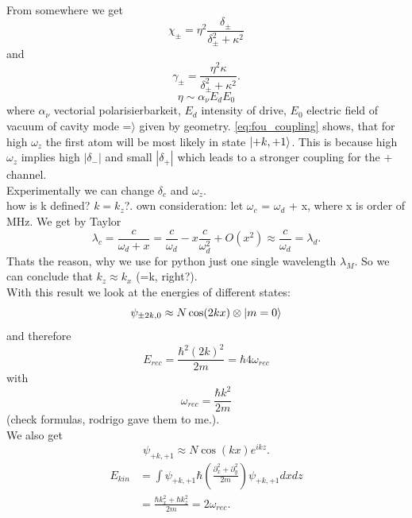 \\
From somewhere we get
\begin{equation}\label{eq:fou_coupling}
	\chi_\pm = \eta^2 \frac{\delta_\pm}{\delta_\pm^2 + \kappa^2}
\end{equation}
and
\begin{equation}
	\gamma_\pm = \frac{\eta^2 \kappa}{\delta_\pm^2 + \kappa^2}.
\end{equation}
\begin{equation}
	\eta \sim \alpha_\nu E_d E_0
\end{equation}
where $\alpha_\nu$ vectorial polarisierbarkeit, $E_d$ intensity of drive, $E_0$ electric field of vacuum of cavity mode =$\rangle$ given by geometry. \ref{eq:fou_coupling} shows, that for high $\omega_z$ the first atom will be most likely in state $\ket{+k,+1}$. This is because high $\omega_z$ implies high $| \delta_- |$ and small $| \delta_+ |$ which leads to a stronger coupling for the + channel. 
\\
Experimentally we can change $\delta_c$ and $\omega_z$.  
\\ 
 how is k defined? $k=k_z$?. own consideration: let $\omega_c$ = $\omega_d$ + x, where x is order of MHz. We get by Taylor
 \begin{equation}
 	\lambda_c = \frac{c}{\omega_d + x} = \frac{c}{\omega_d}- x \frac{c}{\omega_d^2} + O(x^2) \approx \frac{c}{\omega_d} = \lambda_d.
 \end{equation}
Thats the reason, why we use for python just one single wavelength $\lambda_M$. So we can conclude that $k_z \approx k_x$ (=k, right?). 
 \\
 With this result we look at the energies of different states: 
 \begin{equation}
 	\psi_{\pm 2 k, 0} \approx N \cos(2kx) \otimes \ket{m=0}
 \end{equation}
 and therefore
 \begin{equation}
 	E_{rec} = \frac{\hbar^2 (2k)^2}{2m} = \hbar 4 \omega_{rec}
 \end{equation}
 with 
 \begin{equation}
 	\omega_{rec} =  \frac{\hbar k^2}{2m}
 \end{equation}
 (check formulas, rodrigo gave them to me.).
 \\
 We also get
 \begin{equation}
 	\psi_{+k,+1} \approx N \cos(kx)e^{ikz}.
 \end{equation}
\begin{align}
	E_{kin} &= \int \psi_{+k,+1} \hbar \left ( \frac{\partial_x^2 + \partial_y^2}{2m} \right) \psi_{+k,+1} dx dz
	\\
	& =\frac{\hbar k_x^2 + \hbar k_z^2}{2m} = 2 \omega_{rec}.
\end{align}
